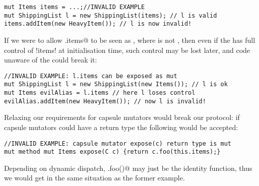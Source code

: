 \begin{lstlisting}
mut Items items = ...;//INVALID EXAMPLE
mut ShippingList l = new ShippingList(items); // l is valid
items.addItem(new HeavyItem()); // l is now invalid!
\end{lstlisting}
If we were to allow \Q@x.items@ to be seen as \Q@mut@, where \Q@x@ is not \Q@this@, then  even if the \Q@ShippingList@ has full control of \Q!items! at initialisation time, such control may be lost later, and code unaware of the \Q@ShippingList@ could break it:
\begin{lstlisting}
//INVALID EXAMPLE: l.items can be exposed as mut
mut ShippingList l = new ShippingList(new Items()); // l is ok
mut Items evilAlias = l.items // here l loses control
evilAlias.addItem(new HeavyItem()); // now l is invalid!
\end{lstlisting}
Relaxing our requirements for capsule mutators
would break our protocol: if capsule mutators could have a \Q@mut@ return type the following would be accepted:
\begin{lstlisting}
//INVALID EXAMPLE: capsule mutator expose(c) return type is mut
mut method mut Items expose(C c) {return c.foo(this.items);}
\end{lstlisting}
Depending on dynamic dispatch, \Q@c.foo()@ may just be the identity function, thus
we would get in the same situation as the former example.




